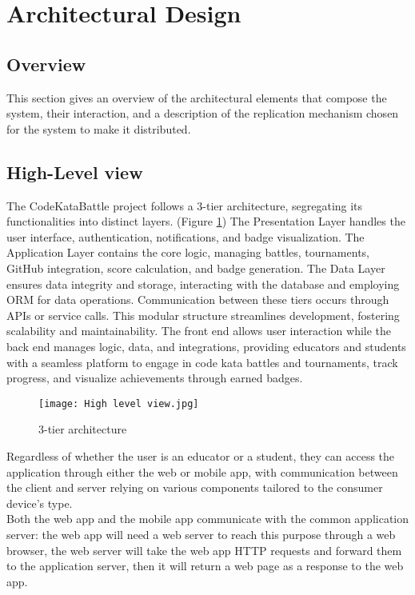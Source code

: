 \documentclass{article}
\begin{document}
\section{Architectural Design}

\subsection{Overview}
This section gives an overview of the architectural elements that compose the system, their interaction, and a description of the replication mechanism chosen for the system to make it distributed.
\subsection{High-Level view}
The CodeKataBattle project follows a 3-tier architecture, segregating its functionalities into distinct layers. (Figure \ref{fig:3-tier}) The Presentation Layer handles the user interface, authentication, notifications, and badge visualization. The Application Layer contains the core logic, managing battles, tournaments, GitHub integration, score calculation, and badge generation. The Data Layer ensures data integrity and storage, interacting with the database and employing ORM for data operations. Communication between these tiers occurs through APIs or service calls. This modular structure streamlines development, fostering scalability and maintainability. The front end allows user interaction while the back end manages logic, data, and integrations, providing educators and students with a seamless platform to engage in code kata battles and tournaments, track progress, and visualize achievements through earned badges.
\begin{figure}[H]
    \centering
    \texttt{[image: High level view.jpg]}
    \caption{3-tier architecture}
    \label{fig:3-tier}
\end{figure}
\noindent
Regardless of whether the user is an educator or a student, they can access the application through either the web or mobile app, with communication between the client and server relying on various components tailored to the consumer device's type.\\
Both the web app and the mobile app communicate with the common application server: the web app will need a web server to reach this purpose through a web browser, the web server will take the web app HTTP requests and forward them to the application server, then it will return a web page as a response to the web app.\\
\end{document}
